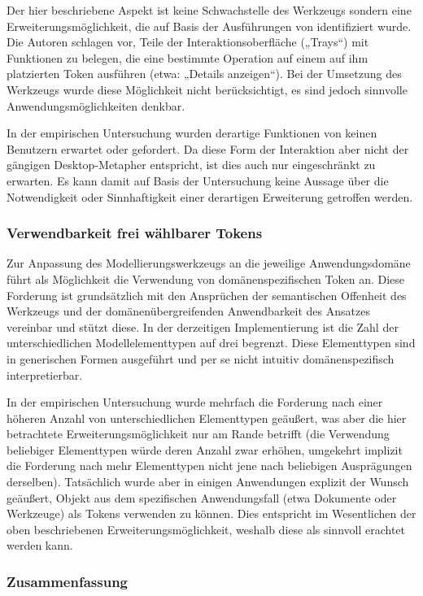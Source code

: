 Der hier beschriebene Aspekt ist keine Schwachstelle des Werkzeugs sondern eine Erweiterungsmöglichkeit, die auf Basis der Ausführungen von \citet{Ishii97} identifiziert wurde. Die Autoren schlagen vor, Teile der Interaktionsoberfläche („Trays“) mit Funktionen zu belegen, die eine bestimmte Operation auf einem auf ihm platzierten Token ausführen (etwa: „Details anzeigen“). Bei der Umsetzung des Werkzeugs wurde diese Möglichkeit nicht berücksichtigt, es sind jedoch sinnvolle Anwendungsmöglichkeiten denkbar.

In der empirischen Untersuchung wurden derartige Funktionen von keinen Benutzern erwartet oder gefordert. Da diese Form der Interaktion aber nicht der gängigen Desktop-Metapher entspricht, ist dies auch nur eingeschränkt zu erwarten. Es kann damit auf Basis der Untersuchung keine Aussage über die Notwendigkeit oder Sinnhaftigkeit einer derartigen Erweiterung getroffen werden.

\subsubsection{Verwendbarkeit frei wählbarer Tokens}

Zur Anpassung des Modellierungswerkzeugs an die jeweilige Anwendungsdomäne führt \citet{Holmquist99} als Möglichkeit die Verwendung von domänenspezifischen Token an. Diese Forderung ist grundsätzlich mit den Ansprüchen der semantischen Offenheit des Werkzeugs und der domänenübergreifenden Anwendbarkeit des Ansatzes vereinbar und stützt diese. In der derzeitigen Implementierung ist die Zahl der unterschiedlichen Modellelementtypen auf drei begrenzt. Diese Elementtypen sind in generischen Formen ausgeführt und per se nicht intuitiv domänenspezifisch interpretierbar.

In der empirischen Untersuchung wurde mehrfach die Forderung nach einer höheren Anzahl von unterschiedlichen Elementtypen geäußert, was aber die hier betrachtete Erweiterungsmöglichkeit nur am Rande betrifft (die Verwendung beliebiger Elementtypen würde deren Anzahl zwar erhöhen, umgekehrt implizit die Forderung nach mehr Elementtypen nicht jene nach beliebigen Ausprägungen derselben). Tatsächlich wurde aber in einigen Anwendungen explizit der Wunsch geäußert, Objekt aus dem spezifischen Anwendungsfall (etwa Dokumente oder Werkzeuge) als Tokens verwenden zu können. Dies entspricht im Wesentlichen der oben beschriebenen Erweiterungsmöglichkeit, weshalb diese als sinnvoll erachtet werden kann. 

\subsubsection{Zusammenfassung} %
\label{ssub:gegenüberstellung_zusammenfassung}

